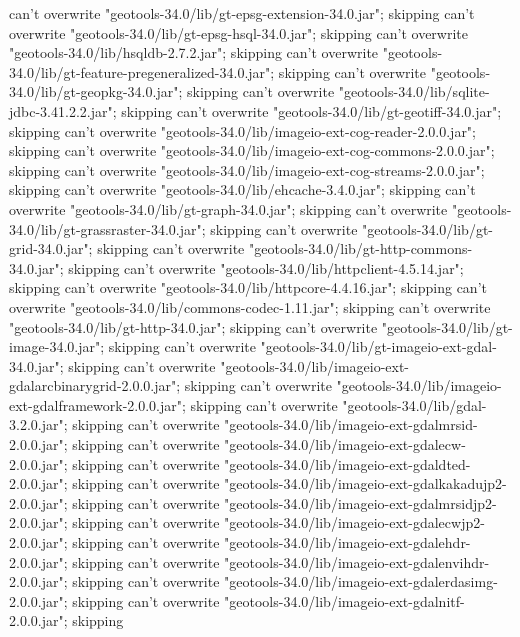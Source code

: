     can't overwrite "geotools-34.0/lib/gt-epsg-extension-34.0.jar"; skipping
    can't overwrite "geotools-34.0/lib/gt-epsg-hsql-34.0.jar"; skipping
    can't overwrite "geotools-34.0/lib/hsqldb-2.7.2.jar"; skipping
    can't overwrite "geotools-34.0/lib/gt-feature-pregeneralized-34.0.jar"; skipping
    can't overwrite "geotools-34.0/lib/gt-geopkg-34.0.jar"; skipping
    can't overwrite "geotools-34.0/lib/sqlite-jdbc-3.41.2.2.jar"; skipping
    can't overwrite "geotools-34.0/lib/gt-geotiff-34.0.jar"; skipping
    can't overwrite "geotools-34.0/lib/imageio-ext-cog-reader-2.0.0.jar"; skipping
    can't overwrite "geotools-34.0/lib/imageio-ext-cog-commons-2.0.0.jar"; skipping
    can't overwrite "geotools-34.0/lib/imageio-ext-cog-streams-2.0.0.jar"; skipping
    can't overwrite "geotools-34.0/lib/ehcache-3.4.0.jar"; skipping
    can't overwrite "geotools-34.0/lib/gt-graph-34.0.jar"; skipping
    can't overwrite "geotools-34.0/lib/gt-grassraster-34.0.jar"; skipping
    can't overwrite "geotools-34.0/lib/gt-grid-34.0.jar"; skipping
    can't overwrite "geotools-34.0/lib/gt-http-commons-34.0.jar"; skipping
    can't overwrite "geotools-34.0/lib/httpclient-4.5.14.jar"; skipping
    can't overwrite "geotools-34.0/lib/httpcore-4.4.16.jar"; skipping
    can't overwrite "geotools-34.0/lib/commons-codec-1.11.jar"; skipping
    can't overwrite "geotools-34.0/lib/gt-http-34.0.jar"; skipping
    can't overwrite "geotools-34.0/lib/gt-image-34.0.jar"; skipping
    can't overwrite "geotools-34.0/lib/gt-imageio-ext-gdal-34.0.jar"; skipping
    can't overwrite "geotools-34.0/lib/imageio-ext-gdalarcbinarygrid-2.0.0.jar"; skipping
    can't overwrite "geotools-34.0/lib/imageio-ext-gdalframework-2.0.0.jar"; skipping
    can't overwrite "geotools-34.0/lib/gdal-3.2.0.jar"; skipping
    can't overwrite "geotools-34.0/lib/imageio-ext-gdalmrsid-2.0.0.jar"; skipping
    can't overwrite "geotools-34.0/lib/imageio-ext-gdalecw-2.0.0.jar"; skipping
    can't overwrite "geotools-34.0/lib/imageio-ext-gdaldted-2.0.0.jar"; skipping
    can't overwrite "geotools-34.0/lib/imageio-ext-gdalkakadujp2-2.0.0.jar"; skipping
    can't overwrite "geotools-34.0/lib/imageio-ext-gdalmrsidjp2-2.0.0.jar"; skipping
    can't overwrite "geotools-34.0/lib/imageio-ext-gdalecwjp2-2.0.0.jar"; skipping
    can't overwrite "geotools-34.0/lib/imageio-ext-gdalehdr-2.0.0.jar"; skipping
    can't overwrite "geotools-34.0/lib/imageio-ext-gdalenvihdr-2.0.0.jar"; skipping
    can't overwrite "geotools-34.0/lib/imageio-ext-gdalerdasimg-2.0.0.jar"; skipping
    can't overwrite "geotools-34.0/lib/imageio-ext-gdalnitf-2.0.0.jar"; skipping
